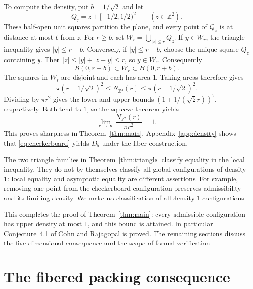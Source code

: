 \documentclass[11pt,a4paper]{article}
\theoremstyle{definition}
\theoremstyle{remark}
\newcommand{\Z}{\mathbb{Z}}
\begin{document}
To compute the density, put $b=1/\sqrt2$ and let
\[
Q_z=z+[-1/2,1/2)^2\qquad(z\in\Z^2).
\]
These half-open unit squares partition the plane, and every point of
$Q_z$ is at distance at most $b$ from $z$. For $r\geq b$, set
$W_r=\bigcup_{|z|\leq r}Q_z$. If $y\in W_r$, the triangle inequality
gives $|y|\leq r+b$. Conversely, if $|y|\leq r-b$, choose the unique
square $Q_z$ containing $y$. Then $|z|\leq|y|+|z-y|\leq r$, so
$y\in W_r$. Consequently
\[
\overline B(0,r-b)\subset W_r\subset\overline B(0,r+b).
\]
The squares in $W_r$ are disjoint and each has area $1$. Taking areas
therefore gives
\[
\pi(r-1/\sqrt2)^2
\leq N_{\Z^2}(r)
\leq\pi(r+1/\sqrt2)^2.
\]
Dividing by $\pi r^2$ gives the lower and upper bounds
$(1\mp1/(\sqrt2 r))^2$, respectively. Both tend to $1$, so the squeeze
theorem yields
\[
\lim_{r\to\infty}\frac{N_{\Z^2}(r)}{\pi r^2}=1.
\]
This proves sharpness in Theorem~\ref{thm:main}. Appendix~\ref{app:density}
shows that \eqref{eq:checkerboard} yields $D_5$ under the fiber
construction.

The two triangle families in Theorem~\ref{thm:triangle} classify equality
in the local inequality. They do not by themselves classify all global
configurations of density $1$: local equality and asymptotic equality
are different assertions. For example, removing one point from the
checkerboard configuration preserves admissibility and its limiting
density. We make no classification of all density-$1$ configurations.

This completes the proof of Theorem~\ref{thm:main}: every admissible
configuration has upper density at most $1$, and this bound is attained.
In particular, Conjecture~4.1 of Cohn and Rajagopal is proved. The
remaining sections discuss the five-dimensional consequence and the scope
of formal verification.

\section{The fibered packing consequence}
\label{sec:fibers}
\end{document}
